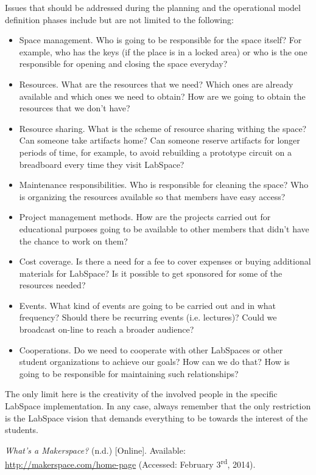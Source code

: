 \documentclass[a4paper, 11pt]{article}
\begin{document}
Issues that should be addressed during the planning and the operational model definition phases include but are not limited to the following:

\begin{itemize}[noitemsep]
    \item Space management. Who is going to be responsible for the space itself? For example, who has the keys (if the place is in a locked area) or who is the one responsible for opening and closing the space everyday?
    \item Resources. What are the resources that we need? Which ones are already available and which ones we need to obtain? How are we going to obtain the resources that we don't have? 
    \item Resource sharing. What is the scheme of resource sharing withing the space? Can someone take artifacts home? Can someone reserve artifacts for longer periods of time, for example, to avoid rebuilding a prototype circuit on a breadboard every time they visit LabSpace?
    \item Maintenance responsibilities. Who is responsible for cleaning the space? Who is organizing the resources available so that members have easy access?
    \item Project management methods. How are the projects carried out for educational purposes going to be available to other members that didn't have the chance to work on them?
    \item Cost coverage. Is there a need for a fee to cover expenses or buying additional materials for LabSpace? Is it possible to get sponsored for some of the resources needed?
    \item Events. What kind of events are going to be carried out and in what frequency? Should there be recurring events (i.e. lectures)? Could we broadcast on-line to reach a broader audience?
    \item Cooperations. Do we need to cooperate with other LabSpaces or other student organizations to achieve our goals? How can we do that? How is going to be responsible for maintaining such relationships?
\end{itemize}

The only limit here is the creativity of the involved people in the specific LabSpace implementation. In any case, always remember that the only restriction is the LabSpace vision that demands everything to be towards the interest of the students.

\newpage

\begin{thebibliography}{9}
     \emph{What’s a Makerspace?} (n.d.) [Online]. Available: \\ \href{http://makerspace.com/home-page}{http://makerspace.com/home-page} (Accessed: February 3\textsuperscript{rd}, 2014).
\end{thebibliography}
\end{document}
